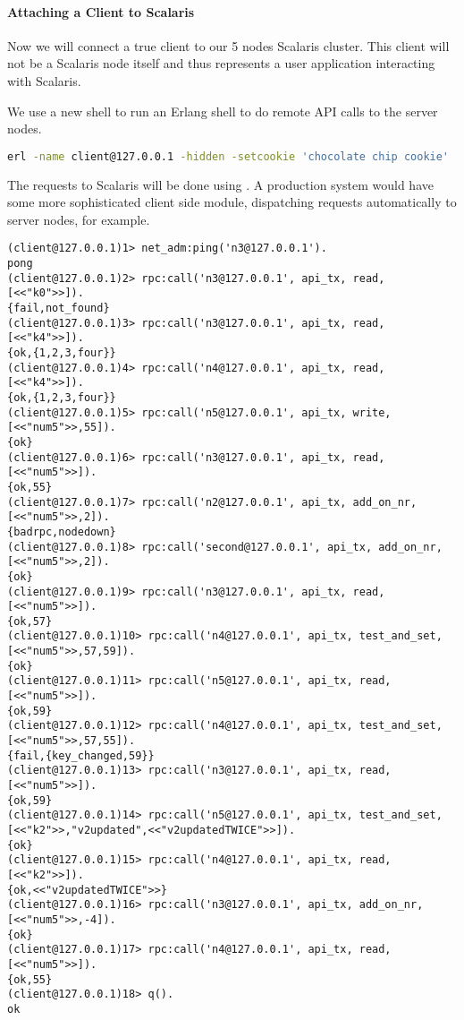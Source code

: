\paragraph{Attaching a Client to Scalaris}
Now we will connect a true client to our 5 nodes Scalaris cluster. This
client will not be a Scalaris node itself and thus represents a user application
interacting with Scalaris.

We use a new shell to run an Erlang shell to do remote API calls to the server nodes.

\begin{lstlisting}[language=sh]
erl -name client@127.0.0.1 -hidden -setcookie 'chocolate chip cookie'
\end{lstlisting}

The requests to Scalaris will be done using . A production system would
have some more sophisticated client side module, dispatching requests automatically to
server nodes, for example.

\begin{lstlisting}
(client@127.0.0.1)1> net_adm:ping('n3@127.0.0.1').
pong
(client@127.0.0.1)2> rpc:call('n3@127.0.0.1', api_tx, read, [<<"k0">>]).
{fail,not_found}
(client@127.0.0.1)3> rpc:call('n3@127.0.0.1', api_tx, read, [<<"k4">>]).
{ok,{1,2,3,four}}
(client@127.0.0.1)4> rpc:call('n4@127.0.0.1', api_tx, read, [<<"k4">>]).
{ok,{1,2,3,four}}
(client@127.0.0.1)5> rpc:call('n5@127.0.0.1', api_tx, write, 
[<<"num5">>,55]).
{ok}
(client@127.0.0.1)6> rpc:call('n3@127.0.0.1', api_tx, read, 
[<<"num5">>]).    
{ok,55}
(client@127.0.0.1)7> rpc:call('n2@127.0.0.1', api_tx, add_on_nr, 
[<<"num5">>,2]).
{badrpc,nodedown}
(client@127.0.0.1)8> rpc:call('second@127.0.0.1', api_tx, add_on_nr, 
[<<"num5">>,2]).
{ok}
(client@127.0.0.1)9> rpc:call('n3@127.0.0.1', api_tx, read, [<<"num5">>]).
{ok,57}
(client@127.0.0.1)10> rpc:call('n4@127.0.0.1', api_tx, test_and_set, 
[<<"num5">>,57,59]).
{ok}
(client@127.0.0.1)11> rpc:call('n5@127.0.0.1', api_tx, read, [<<"num5">>]).
{ok,59}  
(client@127.0.0.1)12> rpc:call('n4@127.0.0.1', api_tx, test_and_set, 
[<<"num5">>,57,55]).
{fail,{key_changed,59}}
(client@127.0.0.1)13> rpc:call('n3@127.0.0.1', api_tx, read, [<<"num5">>]).
{ok,59}
(client@127.0.0.1)14> rpc:call('n5@127.0.0.1', api_tx, test_and_set, 
[<<"k2">>,"v2updated",<<"v2updatedTWICE">>]).
{ok}
(client@127.0.0.1)15> rpc:call('n4@127.0.0.1', api_tx, read, [<<"k2">>]).
{ok,<<"v2updatedTWICE">>}
(client@127.0.0.1)16> rpc:call('n3@127.0.0.1', api_tx, add_on_nr, 
[<<"num5">>,-4]).                               
{ok}
(client@127.0.0.1)17> rpc:call('n4@127.0.0.1', api_tx, read, [<<"num5">>]).
{ok,55}
(client@127.0.0.1)18> q().
ok
\end{lstlisting}

